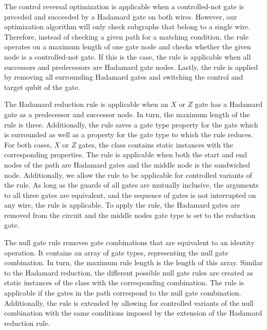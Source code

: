 The control reversal optimization is applicable when a controlled-not gate is preceded and succeeded by a Hadamard gate on both wires. However, our optimization algorithm will only check subgraphs that belong to a single wire. Therefore, instead of checking a given path for a matching condition, the rule operates on a maximum length of one gate node and checks whether the given node is a controlled-not gate. If this is the case, the rule is applicable when all successors and predecessors are Hadamard gate nodes. Lastly, the rule is applied by removing all surrounding Hadamard gates and switching the control and target qubit of the gate.

The Hadamard reduction rule is applicable when an $X$ or $Z$ gate has a Hadamard gate as a predecessor and successor node. In turn, the maximum length of the rule is three. Additionally, the rule saves a gate type property for the gate which is surrounded as well as a property for the gate type to which the rule reduces. For both cases, \ie $X$ or $Z$ gates, the class contains static instances with the corresponding properties. The rule is applicable when both the start and end nodes of the path are Hadamard gates and the middle node is the sandwiched node. Additionally, we allow the rule to be applicable for controlled variants of the rule. As long as the guards of all gates are mutually inclusive, the arguments to all three gates are equivalent, and the sequence of gates is not interrupted on any wire, the rule is applicable. To apply the rule, the Hadamard gates are removed from the circuit and the middle nodes gate type is set to the reduction gate.

The null gate rule removes gate combinations that are equivalent to an identity operation. It contains an array of gate types, representing the null gate combination. In turn, the maximum rule length is the length of this array. Similar to the Hadamard reduction, the different possible null gate rules are created as static instances of the class with the corresponding combination. The rule is applicable if the gates in the path correspond to the null gate combination. Additionally, the rule is extended by allowing for controlled variants of the null combination with the same conditions imposed by the extension of the Hadamard reduction rule.

